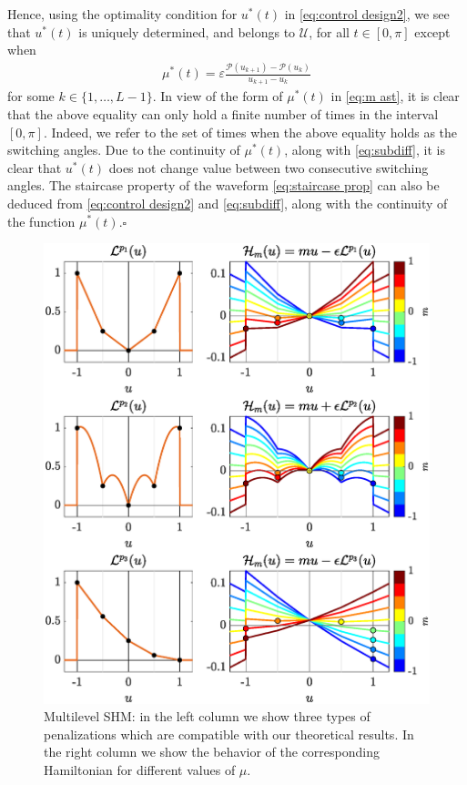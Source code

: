 \documentclass[twocolumn]{autart}    %
\begin{document}
\begin{remark}
Hence, using the optimality condition for $u^\ast(t)$ in \eqref{eq:control design2}, we see that $u^\ast(t)$ is uniquely determined, and belongs to $\mathcal{U}$, for all $t\in [0,\pi]$ except when
\begin{align*}
	\mu^\ast(t) = \varepsilon \frac{\mathcal{P}(u_{k+1}) - \mathcal{P}(u_k)}{u_{k+1} -u_k}
\end{align*} 
for some $k\in\{1,\ldots, L-1\}$. In view of the form of $\mu^\ast(t)$ in \eqref{eq:m ast}, it is clear that the above equality can only hold a finite number of times in the interval $[0,\pi]$. Indeed, we refer to the set of times when the above equality holds as the switching angles.
Due to the continuity of $\mu^\ast(t)$, along with \eqref{eq:subdiff}, it is clear that $u^\ast(t)$ does not change value between two consecutive switching angles. The staircase property of the waveform \eqref{eq:staircase prop} can also be deduced from \eqref{eq:control design2} and \eqref{eq:subdiff}, along with the continuity of the function $\mu^\ast(t)$.\hfill $\square$

\begin{figure}[h]
	\includegraphics[scale=0.415]{img/fig04.eps}
	\caption{Multilevel SHM: in the left column we show three types of penalizations which are compatible with our theoretical results. In the right column we show the behavior of the corresponding Hamiltonian for different values of $\mu$.}\label{fig:SHE-multi}
\end{figure} 
\end{remark}
\end{document}
